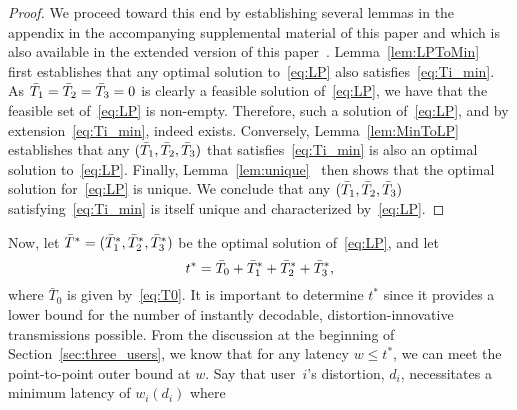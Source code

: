 \begin{proof}
We proceed toward this end by establishing several lemmas in the appendix in the accompanying supplemental material of this paper and which is also available in the extended version of this paper~\cite{TMK_feedback3_arxiv}.
Lemma~\ifarxiv\ref{lem:LPToMin}\else\lemOPSatisfiesCond{}\fi~\cite{TMK_feedback3_arxiv} first establishes that any optimal solution to~\eqref{eq:LP} also satisfies~\eqref{eq:Ti_min}.  As $\bar{T}_{1} = \bar{T}_{2} = \bar{T}_{3} = 0$ is clearly a feasible solution of~\eqref{eq:LP}, we have that the feasible set of~\eqref{eq:LP} is non-empty.  Therefore, such a solution of~\eqref{eq:LP}, and by extension~\eqref{eq:Ti_min}, indeed exists.  
%
Conversely, Lemma~\ifarxiv\ref{lem:MinToLP}\else\lemCondSatisfiesOP{}\fi~\cite{TMK_feedback3_arxiv} establishes that any $(\bar{T}_{1}, \bar{T}_{2}, \bar{T}_{3})$ that satisfies~\eqref{eq:Ti_min} is also an optimal solution to~\eqref{eq:LP}.  
%
Finally, Lemma~\ifarxiv\ref{lem:unique}\else\lemOPunique{}\fi~\cite{TMK_feedback3_arxiv} then shows that the optimal solution for~\eqref{eq:LP} is unique.  We conclude that any $(\bar{T}_{1}, \bar{T}_{2}, \bar{T}_{3})$ satisfying~\eqref{eq:Ti_min} is itself unique and characterized by~\eqref{eq:LP}.
\end{proof}
Now, let $\bar{T}^{*} = (\bar{T}_{1}^{*}, \bar{T}_{2}^{*}, \bar{T}_{3}^{*})$ be the optimal solution of~\eqref{eq:LP}, %
and let %
\begin{equation}
\label{eq:t_star}
	t^{*} = \bar{T}_{0} + \bar{T}_{1}^{*} + \bar{T}_{2}^{*} + \bar{T}_{3}^{*},
\end{equation}  
%
where $\bar{T}_{0}$ is given by~\eqref{eq:T0}.
It is important to determine $t^{*}$ since it provides a lower bound for the number of instantly decodable, distortion-innovative transmissions possible.  From the discussion at the beginning of Section~\ref{sec:three_users}, we know that for any latency $w \leq t^{*}$, we can meet the point-to-point outer bound at $w$.  Say that user~$i$'s distortion, $d_i$, necessitates a minimum latency of $w_i(d_i)$ where

